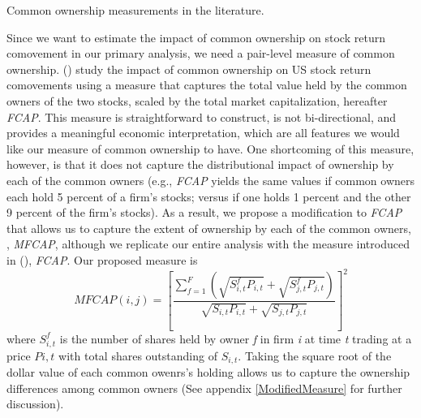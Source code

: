 	{\begin{table}[htbp]
			\centering
			\scriptsize
			\caption{ Common ownership measurements in the literature.}
			\label{maasurmentsSummary}
			\resizebox{\textwidth}{!}{
				
			}
		\end{table}
	}
	
Since we want to estimate the impact of common ownership on stock return comovement in our primary analysis, we need a pair-level measure of common ownership. (\cite{AntonPolk}) study the impact of common ownership on US stock return comovements using a measure that captures the total value held by the common owners of the two stocks, scaled by the total market capitalization, hereafter \textit{FCAP}. This measure is straightforward to construct, is not bi-directional, and provides a meaningful economic interpretation, which are all features we would like our measure of common ownership to have. One shortcoming of this measure, however, is that it does not capture the distributional impact of ownership by each of the common owners (e.g., \textit{FCAP} yields the same values if common owners each hold 5 percent of a firm's stocks; versus if one holds 1 percent and the other 9 percent of the firm's stocks). As a result, we propose a modification to \textit{FCAP} that allows us to capture the extent of ownership by each of the common owners, , \textit{MFCAP}, although we replicate our entire analysis with the measure introduced in (\cite{AntonPolk}), \textit{FCAP}. Our proposed measure is
\begin{equation}
	MFCAP(i, j) =  [\frac{\sum_{f =1}^{F}(\sqrt{S^f_{i,t}P_{i,t}}+\sqrt{S^f_{j,t}P_{j,t}})}{\sqrt{S_{i,t}P_{i,t}} + \sqrt{S_{j,t}P_{j,t}}}]^2 
	\label{sqrt}
\end{equation}
where $ S^f_{i,t}$ is the number of shares held by owner \textit{f} in firm \textit{i} at time \textit{t} trading at a price $ P{i,t} $ with total shares outstanding of $ S_{i,t} $. Taking the square root of the dollar value of each common owenrs's holding allows us to capture the ownership differences among common owners ({See appendix \ref{ModifiedMeasure}} for further discussion). 


